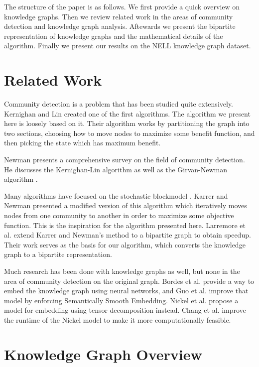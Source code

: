 \documentclass[12pt]{article}
\begin{document}
The structure of the paper is as follows. We first provide a quick overview on
knowledge graphs. Then we review related work in the areas of community
detection and knowledge graph analysis. Aftewards we present the bipartite
representation of knowledge graphs and the mathematical details of the
algorithm. Finally we present our results on the NELL \cite{Carlson2010}
knowledge graph dataset.

\section{Related Work}
\label{Related Work}

Community detection is a problem that has been studied quite extensively.
Kernighan and Lin \cite{Kernighan1970} created one of the first algorithms. The
algorithm we present here is loosely based on it. Their algorithm works by
partitioning the graph into two sections, choosing how to move nodes to maximize
some benefit function, and then picking the state which has maximum benefit.

Newman \cite{Newman2004} presents a comprehensive survey on the field of
community detection. He discusses the Kernighan-Lin algorithm as well as the
Girvan-Newman algorithm \cite{Girvan2002}.

Many algorithms have focused on the stochastic blockmodel \cite{Holland1983,
Ball2011}. Karrer and Newman \cite{Karrer2011} presented a modified version of
this algorithm which iteratively moves nodes from one community to another in
order to maximize some objective function. This is the inspiration for the
algorithm presented here. Larremore et al. \cite{Larremore2014} extend Karrer
and Newman's method to a bipartite graph to obtain speedup. Their work serves as
the basis for our algorithm, which converts the knowledge graph to a bipartite
representation.

Much research has been done with knowledge graphs as well, but none in the area
of community detection on the original graph. Bordes et al. \cite{Bordes2013}
provide a way to embed the knowledge graph using neural networks, and Guo et al.
\cite{Guo2015} improve that model by enforcing Semantically Smooth Embedding.
Nickel et al. \cite{Nickel2011} propose a model for embedding using tensor
decomposition instead. Chang et al. \cite{Chang2014} improve the runtime of the
Nickel model to make it more computationally feasible.

\section{Knowledge Graph Overview}
\label{Knowledge Graph Overview}
\end{document}
